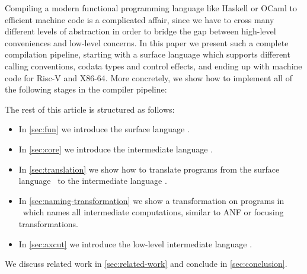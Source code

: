 Compiling a modern functional programming language like Haskell or OCaml to efficient machine code is a complicated affair, since we have to cross many different levels of abstraction in order to bridge the gap between high-level conveniences and low-level concerns.
In this paper we present such a complete compilation pipeline, starting with a surface language which supports different calling conventions, codata types and control effects, and ending up with machine code for Risc-V and X86-64.
More concretely, we show how to implement all of the following stages in the compiler pipeline:
\medskip

\begin{center}
\end{center}

The rest of this article is structured as follows:
\begin{itemize}
    \item In \cref{sec:fun} we introduce the surface language \surfacelang.
    \item In \cref{sec:core} we introduce the intermediate language \targetlang.
    \item In \cref{sec:translation} we show how to translate programs from the surface language \surfacelang\ to the intermediate language \targetlang.
    \item In \cref{sec:naming-transformation} we show a transformation on programs in \targetlang\ which names all intermediate computations, similar to ANF or focusing transformations.
    \item In \cref{sec:axcut} we introduce the low-level intermediate language \machinelang.
\end{itemize}
We discuss related work in \cref{sec:related-work} and conclude in \cref{sec:conclusion}.
